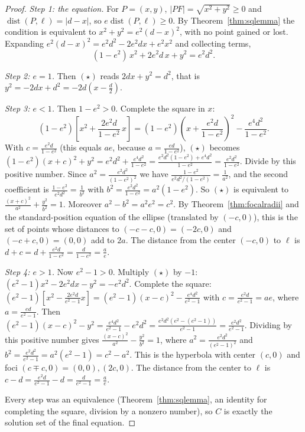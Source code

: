 \documentclass[11pt]{article}
\begin{document}
\begin{proof}
\emph{Step 1: the equation.} For $P=(x,y)$, $\lvert PF\rvert=\sqrt{x^2+y^2}\ge0$ and $\operatorname{dist}(P,\ell)=\lvert d-x\rvert$, so $e\operatorname{dist}(P,\ell)\ge0$. By Theorem~\ref{thm:sqlemma} the condition is equivalent to $x^2+y^2=e^2(d-x)^2$, with no point gained or lost. Expanding $e^2(d-x)^2=e^2d^2-2e^2dx+e^2x^2$ and collecting terms,
\[
(1-e^2)\,x^2+2e^2d\,x+y^2=e^2d^2 .\tag{$\star$}
\]

\emph{Step 2: $e=1$.} Then $(\star)$ reads $2dx+y^2=d^2$, that is $y^2=-2dx+d^2=-2d\left(x-\frac d2\right)$.

\emph{Step 3: $e<1$.} Then $1-e^2>0$. Complete the square in $x$:
\[
(1-e^2)\left[x^2+\frac{2e^2d}{1-e^2}\,x\right]=(1-e^2)\left(x+\frac{e^2d}{1-e^2}\right)^2-\frac{e^4d^2}{1-e^2}.
\]
With $c=\frac{e^2d}{1-e^2}$ (this equals $ae$, because $a=\frac{ed}{1-e^2}$), $(\star)$ becomes $(1-e^2)(x+c)^2+y^2=e^2d^2+\frac{e^4d^2}{1-e^2}=\frac{e^2d^2(1-e^2)+e^4d^2}{1-e^2}=\frac{e^2d^2}{1-e^2}$. Divide by this positive number. Since $a^2=\frac{e^2d^2}{(1-e^2)^2}$ we have $\frac{1-e^2}{e^2d^2/(1-e^2)}=\frac1{a^2}$, and the second coefficient is $\frac{1-e^2}{e^2d^2}=\frac1{b^2}$ with $b^2=\frac{e^2d^2}{1-e^2}=a^2(1-e^2)$. So $(\star)$ is equivalent to $\frac{(x+c)^2}{a^2}+\frac{y^2}{b^2}=1$. Moreover $a^2-b^2=a^2e^2=c^2$. By Theorem~\ref{thm:focalradii} and the standard-position equation of the ellipse (translated by $(-c,0)$), this is the set of points whose distances to $(-c-c,0)=(-2c,0)$ and $(-c+c,0)=(0,0)$ add to $2a$. The distance from the center $(-c,0)$ to $\ell$ is $d+c=d+\frac{e^2d}{1-e^2}=\frac d{1-e^2}=\frac ae$.

\emph{Step 4: $e>1$.} Now $e^2-1>0$. Multiply $(\star)$ by $-1$: $(e^2-1)x^2-2e^2dx-y^2=-e^2d^2$. Complete the square: $(e^2-1)\left[x^2-\frac{2e^2d}{e^2-1}x\right]=(e^2-1)(x-c)^2-\frac{e^4d^2}{e^2-1}$ with $c=\frac{e^2d}{e^2-1}=ae$, where $a=\frac{ed}{e^2-1}$. Then $(e^2-1)(x-c)^2-y^2=\frac{e^4d^2}{e^2-1}-e^2d^2=\frac{e^2d^2\left(e^2-(e^2-1)\right)}{e^2-1}=\frac{e^2d^2}{e^2-1}$. Dividing by this positive number gives $\frac{(x-c)^2}{a^2}-\frac{y^2}{b^2}=1$, where $a^2=\frac{e^2d^2}{(e^2-1)^2}$ and $b^2=\frac{e^2d^2}{e^2-1}=a^2(e^2-1)=c^2-a^2$. This is the hyperbola with center $(c,0)$ and foci $(c\mp c,0)=(0,0),(2c,0)$. The distance from the center to $\ell$ is $c-d=\frac{e^2d}{e^2-1}-d=\frac d{e^2-1}=\frac ae$.

Every step was an equivalence (Theorem~\ref{thm:sqlemma}, an identity for completing the square, division by a nonzero number), so $C$ is exactly the solution set of the final equation.
\end{proof}
\end{document}
